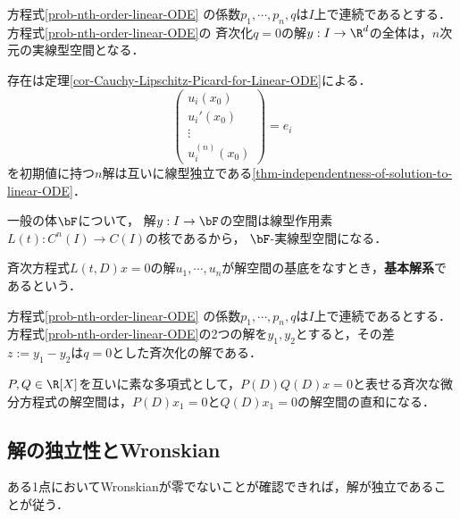\documentclass[uplatex,dvipdfmx]{jsreport}
\begin{document}
\begin{proposition}[斉次方程式の解空間の次元]
    方程式\ref{prob-nth-order-linear-ODE}
    の係数$p_1,\cdots,p_n,q$は$I$上で連続であるとする．
    方程式\ref{prob-nth-order-linear-ODE}の
    斉次化$q=0$の解$y:I\to\R^d$の全体は，$n$次元の実線型空間となる．
\end{proposition}
\begin{Proof}
    存在は定理\ref{cor-Cauchy-Lipschitz-Picard-for-Linear-ODE}による．
    \[\begin{pmatrix}
        u_i(x_0)\\
        u_i'(x_0)\\
        \vdots\\
        u_i^{(n)}(x_0)
    \end{pmatrix}=e_i\]
    を初期値に持つ$n$解は互いに線型独立である\ref{thm-independentness-of-solution-to-linear-ODE}．
\end{Proof}
\begin{remark}
    一般の体$\bF$について，
    解$y:I\to\bF$の空間は線型作用素$L(t):C^n(I)\to C(I)$の核であるから，
    $\bF$-実線型空間になる．
\end{remark}

\begin{definition}
    斉次方程式$L(t,D)x=0$の解$u_1,\cdots,u_n$が解空間の基底をなすとき，\textbf{基本解系}であるという．
\end{definition}

\begin{proposition}[非斉次方程式の解はaffine空間をなす]
    方程式\ref{prob-nth-order-linear-ODE}
    の係数$p_1,\cdots,p_n,q$は$I$上で連続であるとする．
    方程式\ref{prob-nth-order-linear-ODE}の2つの解を$y_1,y_2$とすると，その差
    $z:=y_1-y_2$は$q=0$とした斉次化の解である．
\end{proposition}

\begin{theorem}[多項式積は解空間の和に対応する]
    $P,Q\in\R[X]$を互いに素な多項式として，$P(D)Q(D)x=0$と表せる斉次な微分方程式の解空間は，$P(D)x_1=0$と$Q(D)x_1=0$の解空間の直和になる．
\end{theorem}

\subsection{解の独立性とWronskian}

\begin{tcolorbox}[colframe=ForestGreen, colback=ForestGreen!10!white,breakable,colbacktitle=ForestGreen!40!white,coltitle=black,fonttitle=\bfseries\sffamily,
title=]
    ある1点においてWronskianが零でないことが確認できれば，解が独立であることが従う．
\end{tcolorbox}
\end{document}
